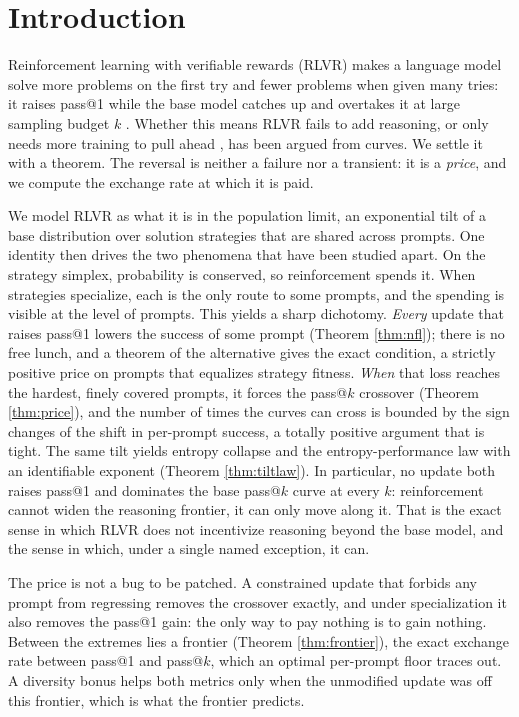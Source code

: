 \section{Introduction}
\label{sec:intro}

Reinforcement learning with verifiable rewards (RLVR) makes a language model
solve more problems on the first try and fewer problems when given many tries:
it raises pass@1 while the base model catches up and overtakes it at large
sampling budget $k$ \citep{yue2025rlincentivize}. Whether this means RLVR fails to
add reasoning, or only needs more training to pull ahead \citep{liu2025prorl},
has been argued from curves. We settle it with a theorem. The reversal is
neither a failure nor a transient: it is a \emph{price}, and we compute the
exchange rate at which it is paid.

We model RLVR as what it is in the population limit, an exponential tilt of a
base distribution over solution strategies that are shared across prompts. One
identity then drives the two phenomena that have been studied apart. On the
strategy simplex, probability is conserved, so reinforcement spends it. When
strategies specialize, each is the only route to some prompts, and the spending
is visible at the level of prompts. This yields a sharp dichotomy. \emph{Every}
update that raises pass@1 lowers the success of some prompt (Theorem
\ref{thm:nfl}); there is no free lunch, and a theorem of the alternative gives
the exact condition, a strictly positive price on prompts that equalizes strategy
fitness. \emph{When} that loss reaches the hardest,
finely covered prompts, it forces the pass@$k$ crossover (Theorem
\ref{thm:price}), and the number of times the curves can cross is bounded by the
sign changes of the shift in per-prompt success, a totally positive argument
that is tight. The same tilt yields entropy collapse and the
entropy-performance law with an identifiable exponent (Theorem
\ref{thm:tiltlaw}). In particular, no update both raises pass@1 and dominates the
base pass@$k$ curve at every $k$: reinforcement cannot widen the reasoning
frontier, it can only move along it. That is the exact sense in which RLVR does
not incentivize reasoning beyond the base model, and the sense in which, under a
single named exception, it can.

The price is not a bug to be patched. A constrained update that forbids any
prompt from regressing removes the crossover exactly, and under specialization
it also removes the pass@1 gain: the only way to pay nothing is to gain nothing.
Between the extremes lies a frontier (Theorem \ref{thm:frontier}), the exact
exchange rate between pass@1 and pass@$k$, which an optimal per-prompt floor
traces out. A diversity bonus helps both metrics only when the unmodified update
was off this frontier, which is what the frontier predicts.

